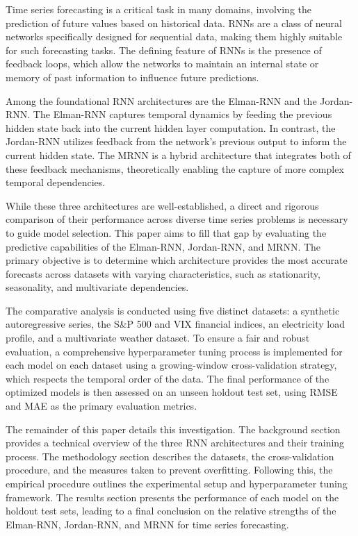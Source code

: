 \documentclass[conference, 10pt]{IEEEtran}
\begin{document}
Time series forecasting is a critical task in many domains, involving the prediction of future values based on
historical data. RNNs are a class of neural networks specifically designed for sequential
data, making them highly suitable for such forecasting tasks. The defining feature of RNNs is the presence of feedback
loops, which allow the networks to maintain an internal state or memory of past information to influence future
predictions.

Among the foundational RNN architectures are the Elman-RNN and the Jordan-RNN. The Elman-RNN captures temporal dynamics
by feeding the previous hidden state back into the current hidden layer computation. In contrast, the Jordan-RNN
utilizes feedback from the network's previous output to inform the current hidden state. The MRNN is a hybrid
architecture that integrates both of these feedback mechanisms, theoretically enabling the capture of more complex
temporal dependencies.

While these three architectures are well-established, a direct and rigorous comparison of their performance across
diverse time series problems is necessary to guide model selection. This paper aims to fill that gap by evaluating the
predictive capabilities of the Elman-RNN, Jordan-RNN, and MRNN. The primary objective is to determine which architecture
provides the most accurate forecasts across datasets with varying characteristics, such as stationarity, seasonality,
and multivariate dependencies.

The comparative analysis is conducted using five distinct datasets: a synthetic autoregressive series, the S\&P 500 and
VIX financial indices, an electricity load profile, and a multivariate weather dataset. To ensure a fair and robust
evaluation, a comprehensive hyperparameter tuning process is implemented for each model on each dataset using a
growing-window cross-validation strategy, which respects the temporal order of the data. The final performance of the
optimized models is then assessed on an unseen holdout test set, using RMSE and MAE as the primary evaluation metrics.

The remainder of this paper details this investigation. The background section provides a technical overview of the
three RNN architectures and their training process. The methodology section describes the datasets, the cross-validation
procedure, and the measures taken to prevent overfitting. Following this, the empirical procedure outlines the
experimental setup and hyperparameter tuning framework. The results section presents the performance of each model on
the holdout test sets, leading to a final conclusion on the relative strengths of the Elman-RNN, Jordan-RNN, and MRNN
for time series forecasting.
\end{document}
